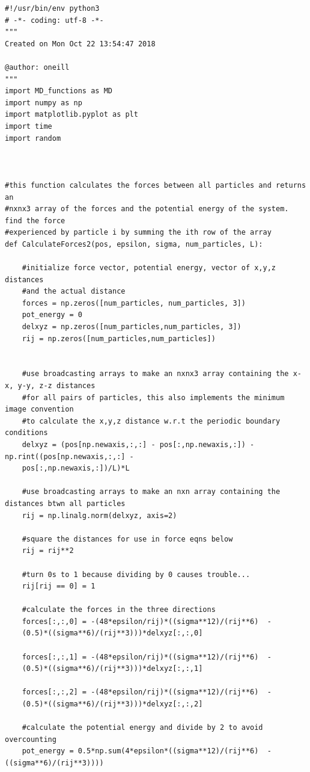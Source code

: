 \documentclass{article}
\begin{document}
\begin{lstlisting}
#!/usr/bin/env python3
# -*- coding: utf-8 -*-
"""
Created on Mon Oct 22 13:54:47 2018

@author: oneill
"""
import MD_functions as MD
import numpy as np
import matplotlib.pyplot as plt
import time
import random



#this function calculates the forces between all particles and returns an 
#nxnx3 array of the forces and the potential energy of the system. find the force
#experienced by particle i by summing the ith row of the array
def CalculateForces2(pos, epsilon, sigma, num_particles, L):
    
    #initialize force vector, potential energy, vector of x,y,z distances
    #and the actual distance
    forces = np.zeros([num_particles, num_particles, 3])
    pot_energy = 0
    delxyz = np.zeros([num_particles,num_particles, 3])
    rij = np.zeros([num_particles,num_particles])
            
    
    #use broadcasting arrays to make an nxnx3 array containing the x-x, y-y, z-z distances
    #for all pairs of particles, this also implements the minimum image convention
    #to calculate the x,y,z distance w.r.t the periodic boundary conditions
    delxyz = (pos[np.newaxis,:,:] - pos[:,np.newaxis,:]) - np.rint((pos[np.newaxis,:,:] - 
    pos[:,np.newaxis,:])/L)*L
    
    #use broadcasting arrays to make an nxn array containing the distances btwn all particles
    rij = np.linalg.norm(delxyz, axis=2)
    
    #square the distances for use in force eqns below
    rij = rij**2
    
    #turn 0s to 1 because dividing by 0 causes trouble... 
    rij[rij == 0] = 1
    
    #calculate the forces in the three directions
    forces[:,:,0] = -(48*epsilon/rij)*((sigma**12)/(rij**6)  -  
    (0.5)*((sigma**6)/(rij**3)))*delxyz[:,:,0]

    forces[:,:,1] = -(48*epsilon/rij)*((sigma**12)/(rij**6)  -  
    (0.5)*((sigma**6)/(rij**3)))*delxyz[:,:,1]

    forces[:,:,2] = -(48*epsilon/rij)*((sigma**12)/(rij**6)  -  
    (0.5)*((sigma**6)/(rij**3)))*delxyz[:,:,2]
    
    #calculate the potential energy and divide by 2 to avoid overcounting
    pot_energy = 0.5*np.sum(4*epsilon*((sigma**12)/(rij**6)  -  ((sigma**6)/(rij**3))))
    

\end{lstlisting}
\end{document}
